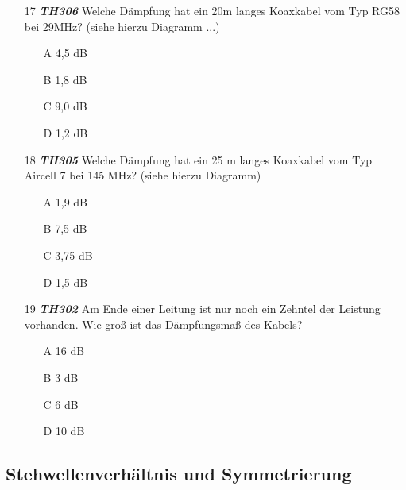 \begin{enumerate} 
\itemsep1pt\parskip0pt
\item[17] \emph{\textbf{TH306}}  Welche Dämpfung hat ein 20m langes Koaxkabel vom Typ RG58 bei 29MHz? (siehe hierzu Diagramm ...)
	\begin{enumerate}
	\itemsep1pt\parskip0pt
		\item[A] 4,5 dB
		\item[B] 1,8 dB
		\item[C] 9,0 dB
		\item[D] 1,2 dB
	\end{enumerate}
\item[18] \emph{\textbf{TH305}}  Welche Dämpfung hat ein 25 m langes Koaxkabel vom Typ Aircell 7 bei 145 MHz? (siehe hierzu Diagramm)
	\begin{enumerate}
	\itemsep1pt\parskip0pt
		\item[A] 1,9 dB
		\item[B] 7,5 dB
		\item[C] 3,75 dB
		\item[D] 1,5 dB
	\end{enumerate}
\item[19] \emph{\textbf{TH302}}  Am Ende einer Leitung ist nur noch ein Zehntel der Leistung vorhanden. Wie groß ist das Dämpfungsmaß des Kabels?
	\begin{enumerate}
	\itemsep1pt\parskip0pt
		\item[A] 16 dB
		\item[B] 3 dB
		\item[C] 6 dB
		\item[D] 10 dB
	\end{enumerate}
\end{enumerate}

\subsection*{Stehwellenverhältnis und Symmetrierung}

